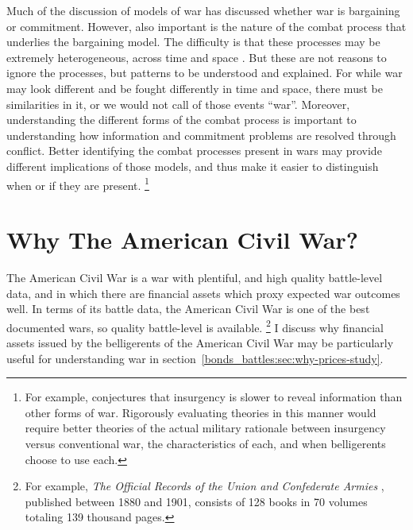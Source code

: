Much of the discussion of models of war has discussed whether war is bargaining or commitment.
However, also important is the nature of the combat process that underlies the bargaining model. %
The difficulty is that these processes may be extremely heterogeneous, across time and space \parencite{Reiter2003}.
But these are not reasons to ignore the processes, but patterns to be understood and explained. %
For while war may look different and be fought differently in time and
space, there must be similarities in it, or we would not call of those events ``war''. %
Moreover, understanding the different forms of the combat process is important to understanding how information and commitment problems are resolved through conflict. %
Better identifying the combat processes present in wars may provide different implications of those models, and thus make it easier to
distinguish when or if they are present.%
\footnote{%
  For example, \textcite{Walter2009} conjectures that insurgency is slower to reveal information than other forms of war. %
  Rigorously evaluating theories in this manner would require better theories of the actual military rationale between insurgency versus conventional war, the characteristics of each, and when belligerents choose to use each.
} %



\section{Why The American Civil War?}
\label{bonds_battles:sec:why-american-civil}

The American Civil War is a war with plentiful, and high quality battle-level data, and in which there are financial assets which proxy expected war outcomes well.
In terms of its battle data, the American Civil War is one of the best documented wars, so quality battle-level is available.%
\footnote{%
  For example, \textit{The Official Records of the Union and  Confederate Armies} \parencites{US1901}, published between 1880 and 1901, consists of 128 books in 70 volumes totaling 139 thousand pages.
  
} %
I discuss why financial assets issued by the belligerents of the American Civil War may be particularly useful for understanding war in section~\ref{bonds_battles:sec:why-prices-study}.

